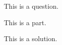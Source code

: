 \begin{question}
  This is a question.
\end{question}

\begin{parts}

  \begin{part}
    This is a part.
  \end{part}

  \begin{solution}
    This is a solution.
  \end{solution}

\end{parts}